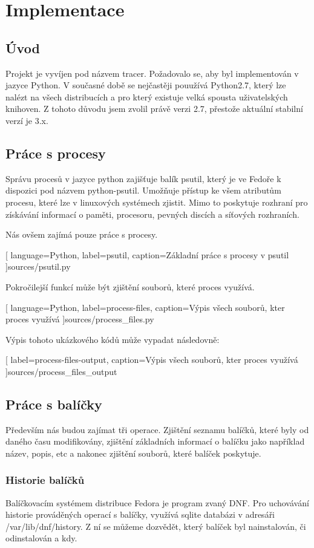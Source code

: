 \documentclass[10pt,a4paper]{article}
\begin{document}
	\section{Implementace}
		\subsection{Úvod}
		Projekt je vyvíjen pod názvem tracer. Požadovalo se, aby byl implementován v jazyce Python. V současné době se nejčastěji pouužívá Python2.7, který lze nalézt na všech distribucích a pro který existuje velká spousta uživatelských knihoven. Z tohoto důvodu jsem zvolil právě verzi 2.7, přestože aktuální stabilní verzí je 3.x.

		\subsection{Práce s procesy}
		Správu procesů v jazyce python zajišťuje balík psutil, který je ve Fedoře k dispozici pod názvem python-psutil. Umožňuje přístup ke všem atributům procesu, které lze v linuxových systémech zjistit. Mimo to poskytuje rozhraní pro získávání informací o paměti, procesoru, pevných discích a síťových rozhraních.

		Nás ovšem zajímá pouze práce s procesy.

		
		[
			language={Python},
			label=psutil,
			caption={Základní práce s procesy v psutil}
		]{sources/psutil.py}

		Pokročilejší funkcí může být zjištění souborů, které proces využívá.

		
		[
			language={Python},
			label=process-files,
			caption={Výpis všech souborů, kter proces využívá}
		]{sources/process_files.py}

		Výpis tohoto ukázkového kódů může vypadat následovně:

		
		[
			label=process-files-output,
			caption={Výpis všech souborů, kter proces využívá}
		]{sources/process_files_output}

		\subsection{Práce s balíčky}
			Především nás budou zajímat tři operace. Zjištění seznamu balíčků, které byly od daného času modifikovány, zjištění základních informací o balíčku jako například název, popis, etc a nakonec zjištění souborů, které balíček poskytuje.

			\subsubsection{Historie balíčků}
			Balíčkovacím systémem distribuce Fedora je program zvaný DNF\@. Pro uchovávání historie prováděných operací s balíčky, využívá sqlite databázi v adresáři /var/lib/dnf/history. Z ní se můžeme dozvědět, který balíček byl nainstalován, či odinstalován a kdy.
\end{document}
